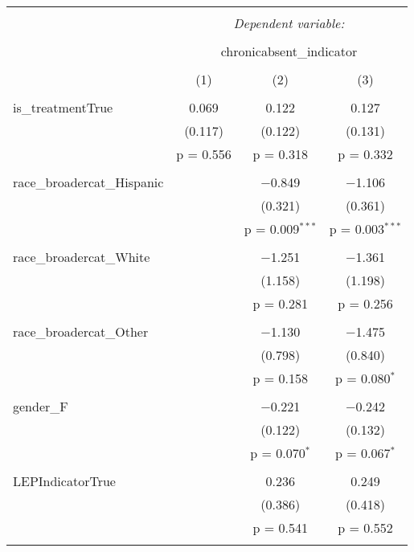 
\begin{table}[!htbp] \centering 
  \caption{} 
  \label{} 
\begin{tabular}{@{\extracolsep{5pt}}lccc} 
\\[-1.8ex]\hline 
\hline \\[-1.8ex] 
 & \multicolumn{3}{c}{\textit{Dependent variable:}} \\ 
\cline{2-4} 
\\[-1.8ex] & \multicolumn{3}{c}{chronicabsent\_indicator} \\ 
\\[-1.8ex] & (1) & (2) & (3)\\ 
\hline \\[-1.8ex] 
 is\_treatmentTrue & 0.069 & 0.122 & 0.127 \\ 
  & (0.117) & (0.122) & (0.131) \\ 
  & p = 0.556 & p = 0.318 & p = 0.332 \\ 
  & & & \\ 
 race\_broadercat\_Hispanic &  & $-$0.849 & $-$1.106 \\ 
  &  & (0.321) & (0.361) \\ 
  &  & p = 0.009$^{***}$ & p = 0.003$^{***}$ \\ 
  & & & \\ 
 race\_broadercat\_White &  & $-$1.251 & $-$1.361 \\ 
  &  & (1.158) & (1.198) \\ 
  &  & p = 0.281 & p = 0.256 \\ 
  & & & \\ 
 race\_broadercat\_Other &  & $-$1.130 & $-$1.475 \\ 
  &  & (0.798) & (0.840) \\ 
  &  & p = 0.158 & p = 0.080$^{*}$ \\ 
  & & & \\ 
 gender\_F &  & $-$0.221 & $-$0.242 \\ 
  &  & (0.122) & (0.132) \\ 
  &  & p = 0.070$^{*}$ & p = 0.067$^{*}$ \\ 
  & & & \\ 
 LEPIndicatorTrue &  & 0.236 & 0.249 \\ 
  &  & (0.386) & (0.418) \\ 
  &  & p = 0.541 & p = 0.552 \\ 
  & & & \\ 

\end{tabular}
\end{table}
